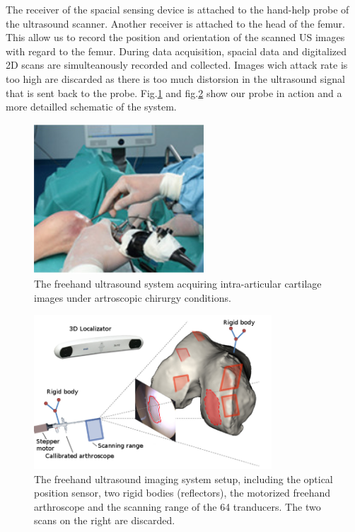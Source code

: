 \documentclass[12pt,journal,compsoc]{IEEEtran}
\begin{document}
The receiver of the spacial sensing device is attached to the hand-help probe of the ultrasound scanner. Another receiver is attached to the head of the femur. This allow us to record the position and orientation of the scanned US images with regard to the femur. 
During data acquisition, spacial data and digitalized 2D scans are simulteanously recorded and collected. Images wich attack rate is too high are discarded as there is too much distorsion in the ultrasound signal that is sent back to the probe. Fig.\ref{system1} and fig.\ref{system2} show our probe in action and a more detailled schematic of the system.


\begin{figure}[h!]
\centering
\includegraphics[width=2.5in]{miticao}
\caption{The freehand ultrasound system acquiring intra-articular cartilage images under artroscopic chirurgy conditions.}
\label{system1}
\end{figure}

\begin{figure}[h!]
\centering
\includegraphics[width=3.5in]{system}
\caption{The freehand ultrasound imaging system setup, including the optical position sensor, two rigid bodies (reflectors), the motorized freehand arthroscope and the scanning range of the 64 tranducers. The two scans on the right are discarded.}
\label{system2}
\end{figure}
\end{document}
